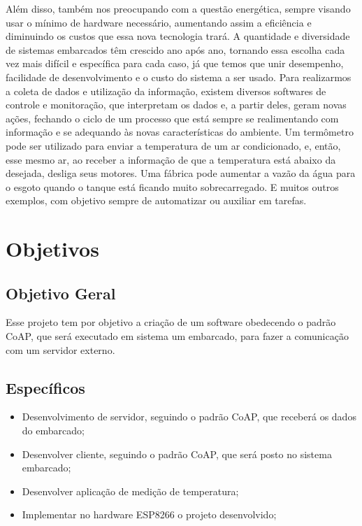 	Além disso, também nos preocupando com a questão energética, sempre visando usar o mínimo de hardware necessário, aumentando assim a eficiência e diminuindo os custos que essa nova tecnologia trará. A quantidade e diversidade de sistemas embarcados têm crescido ano após ano, tornando essa escolha cada vez mais difícil e específica para cada caso, já que temos que unir desempenho, facilidade de desenvolvimento e o custo do sistema a ser usado. Para realizarmos a coleta de dados e utilização da informação, existem diversos softwares de controle e monitoração, que interpretam os dados e, a partir deles, geram novas ações, fechando o ciclo de um processo que está sempre se realimentando com informação e se adequando às novas características do ambiente. Um termômetro pode ser utilizado para enviar a temperatura de um ar condicionado, e, então, esse mesmo ar, ao receber a informação de que a temperatura está abaixo da desejada, desliga seus motores. Uma fábrica pode aumentar a vazão da água para o esgoto quando o tanque está ficando muito sobrecarregado. E muitos outros exemplos, com objetivo sempre de automatizar ou auxiliar em tarefas.

\section{Objetivos}

\subsection{Objetivo Geral}

Esse projeto tem por objetivo a criação de um software obedecendo o padrão CoAP, que será executado em sistema um embarcado, para fazer a comunicação com um servidor externo.

\subsection{Específicos}
\begin{itemize}
	\item Desenvolvimento de servidor, seguindo o padrão CoAP, que receberá os dados do embarcado;
	\item Desenvolver cliente, seguindo o padrão CoAP, que será posto no sistema embarcado;
	\item Desenvolver aplicação de medição de temperatura;
	\item Implementar no hardware ESP8266 o projeto desenvolvido;
\end{itemize}

